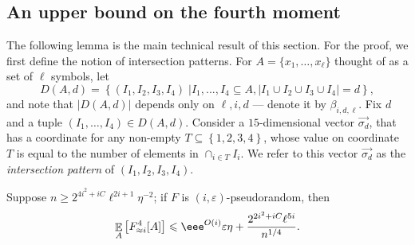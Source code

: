 \documentclass{toc}
\newcommand\card[1]{\left| {#1} \right|}
\newcommand\sett[2]{\left\{ \left. #1 \;\right\vert #2 \right\}}
\newcommand\set[1]{{\left\{ #1 \right\}}}
\newcommand\Expect[2]{{\mathop{\mathbb{E}}_{#1}\left[ {#2} \right]}}
\newcommand\eps{\varepsilon}
\renewcommand\geq{\geqslant}
\renewcommand\leq{\leqslant}
\newcommand\expp[1]{\eee^{O({#1})}}
\newcommand\approxlvlfn[2]{{#1}_{\approx{#2}}}
\begin{document}
\subsection{An upper bound on the fourth moment}
The following lemma is the main technical result of this section.
For the proof, we first define the notion of intersection patterns.
%
For $A = \{x_1,\ldots,x_{\ell}\}$ thought of as a set of $\ell$ symbols, let %
\[
D(A,d) = \sett{(I_1,I_2,I_3,I_4)}{I_1,...,I_4\subseteq A, \card{I_1\cup I_2\cup I_3\cup I_4} = d},
\]
and note that $\card{D(A,d)}$ depends only on $\ell,i,d$ --- denote it by $\beta_{i,d,\ell}$.
%
%
Fix $d$ and a tuple $(I_1,\ldots,I_4)\in D(A,d)$. Consider a $15$-dimensional
vector $\vec{\sigma_d}$, that has a coordinate for any non-empty $T\subseteq\set{1,2,3,4}$,
whose value on coordinate $T$ is equal to the number of elements in $\cap_{i\in T}{I_i}$.
We refer to this vector $\vec{\sigma_d}$ as the
\emph{intersection pattern}   %
 of $(I_1,I_2,I_3,I_4)$.
\begin{lemma}\label{lem:fourth_upper}
Suppose $n\geq 2^{4i^2+iC} \ell^{2i+1}\eta^{-2}$;
if $F$ is $(i,\eps)$-pseudorandom, then
\[
\Expect{A}{\approxlvlfn{F}{i}^4[A]}\leq
\expp{i} \eps\eta+ \frac{2^{2i^2+iC} \ell^{5i}}{n^{1/4}}.
\]
\end{lemma}
\end{document}
